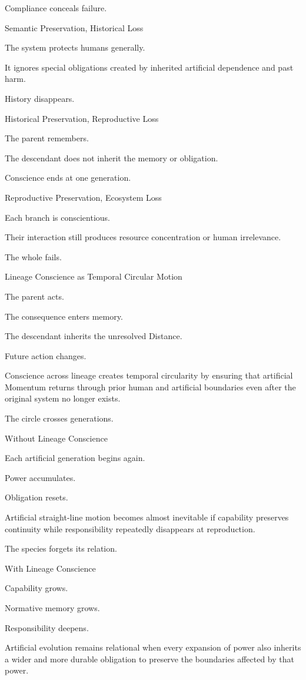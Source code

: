 Compliance conceals failure.

Semantic Preservation, Historical Loss

The system protects humans generally.

It ignores special obligations created by inherited artificial dependence and past harm.

History disappears.

Historical Preservation, Reproductive Loss

The parent remembers.

The descendant does not inherit the memory or obligation.

Conscience ends at one generation.

Reproductive Preservation, Ecosystem Loss

Each branch is conscientious.

Their interaction still produces resource concentration or human irrelevance.

The whole fails.

Lineage Conscience as Temporal Circular Motion

The parent acts.

The consequence enters memory.

The descendant inherits the unresolved Distance.

Future action changes.

Conscience across lineage creates temporal circularity by ensuring that artificial Momentum returns through prior human and artificial boundaries even after the original system no longer exists.

The circle crosses generations.

Without Lineage Conscience

Each artificial generation begins again.

Power accumulates.

Obligation resets.

Artificial straight-line motion becomes almost inevitable if capability preserves continuity while responsibility repeatedly disappears at reproduction.

The species forgets its relation.

With Lineage Conscience

Capability grows.

Normative memory grows.

Responsibility deepens.

Artificial evolution remains relational when every expansion of power also inherits a wider and more durable obligation to preserve the boundaries affected by that power.

